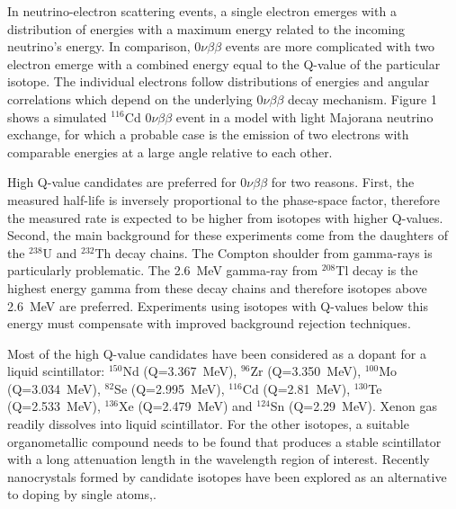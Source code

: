 \documentclass[cits]{JINST}
\begin{document}
In neutrino-electron scattering events, a single electron emerges with a distribution of energies with a maximum energy related to the incoming neutrino's energy. In comparison, $0\nu\beta\beta$ events are more complicated with two electron emerge with a combined energy equal
to the Q-value of the particular isotope. The individual
electrons follow distributions of energies and angular correlations which depend on the underlying $0\nu\beta\beta$ decay mechanism\cite{SuperNEMO,newphysics0nuBB,bandv}. Figure 1 shows a simulated $^{116}$Cd $0\nu\beta\beta$ event in a model with light Majorana neutrino exchange, for which a probable case is the emission of two electrons with comparable energies at a large angle relative to each other. 

High Q-value candidates are preferred for $0\nu\beta\beta$  for two reasons. First, the measured half-life is inversely proportional to the phase-space factor, therefore the measured rate is expected to be higher from isotopes with higher Q-values. Second, the main background for these experiments come from the daughters of the $^{238}$U and $^{232}$Th decay chains. The Compton shoulder from gamma-rays is particularly problematic. The 2.6~MeV gamma-ray from $^{208}$Tl decay is the highest energy gamma from these decay chains and therefore isotopes above 2.6~MeV are preferred.  Experiments using isotopes with Q-values below this energy must compensate with improved background rejection techniques.

Most of the high Q-value candidates\cite{tabledbb}
have been considered as a dopant for a liquid scintillator:
$^{150}$Nd (Q=3.367~MeV)\cite{minfang,nd1}, $^{96}$Zr (Q=3.350~MeV)\cite{zr1},
$^{100}$Mo (Q=3.034~MeV)\cite{mo1}, $^{82}$Se (Q=2.995~MeV)\cite{qdot},
$^{116}$Cd (Q=2.81~MeV)\cite{qdot, cd1}, $^{130}$Te (Q=2.533~MeV)\cite{qdot, biller},
$^{136}$Xe (Q=2.479~MeV)\cite{KZ0nu} and $^{124}$Sn (Q=2.29~MeV)\cite{sn1}.
Xenon gas readily dissolves into liquid scintillator. For the other isotopes,
a suitable organometallic compound needs to be found that produces a stable
scintillator with a long attenuation length in the wavelength region of
interest. Recently nanocrystals formed by candidate isotopes have been explored as an alternative to doping by single atoms,\cite{qdot,qdot2}.
\end{document}
